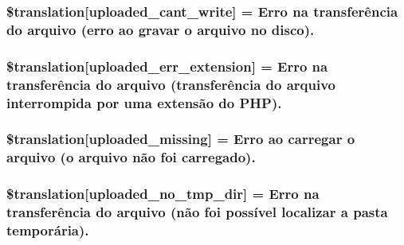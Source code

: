 \subsubsection[{\$translation}]{\setlength{\rightskip}{0pt plus 5cm}\$translation\mbox{[}\textquotesingle{}uploaded\+\_\+cant\+\_\+write\textquotesingle{}\mbox{]} = \textquotesingle{}Erro na transferência do arquivo (erro ao gravar o arquivo no disco).\textquotesingle{}}\label{class_8upload_8pt___b_r_8php_af368fee3b41bc05e6b208c1557a00c00}
\hypertarget{class_8upload_8pt___b_r_8php_a01c69a4c8556602b3892dce727bace11}{}
\subsubsection[{\$translation}]{\setlength{\rightskip}{0pt plus 5cm}\$translation\mbox{[}\textquotesingle{}uploaded\+\_\+err\+\_\+extension\textquotesingle{}\mbox{]} = \textquotesingle{}Erro na transferência do arquivo (transferência do arquivo interrompida por uma extensão do P\+H\+P).\textquotesingle{}}\label{class_8upload_8pt___b_r_8php_a01c69a4c8556602b3892dce727bace11}
\hypertarget{class_8upload_8pt___b_r_8php_a0cce433260be65f1f35853a6b4b8952b}{}
\subsubsection[{\$translation}]{\setlength{\rightskip}{0pt plus 5cm}\$translation\mbox{[}\textquotesingle{}uploaded\+\_\+missing\textquotesingle{}\mbox{]} = \textquotesingle{}Erro ao carregar o arquivo (o arquivo não foi carregado).\textquotesingle{}}\label{class_8upload_8pt___b_r_8php_a0cce433260be65f1f35853a6b4b8952b}
\hypertarget{class_8upload_8pt___b_r_8php_ae3cdc68fe248399f77246c91b0555341}{}
\subsubsection[{\$translation}]{\setlength{\rightskip}{0pt plus 5cm}\$translation\mbox{[}\textquotesingle{}uploaded\+\_\+no\+\_\+tmp\+\_\+dir\textquotesingle{}\mbox{]} = \textquotesingle{}Erro na transferência do arquivo (não foi possível localizar a pasta temporária).\textquotesingle{}}\label{class_8upload_8pt___b_r_8php_ae3cdc68fe248399f77246c91b0555341}
\hypertarget{class_8upload_8pt___b_r_8php_a967c17da21b0a2d3bd65cca3a9ca0ea8}{}
